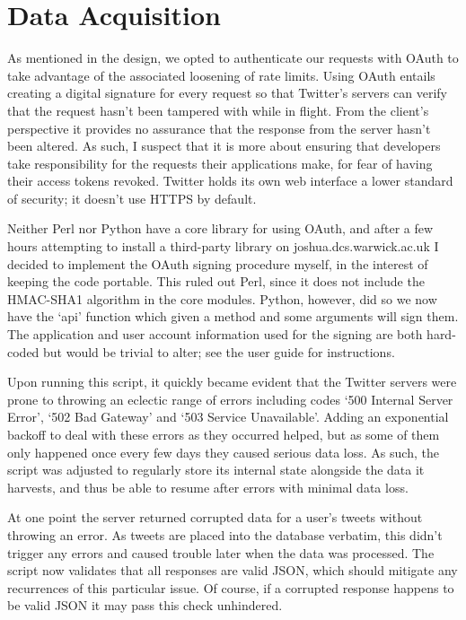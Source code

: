\section{Data Acquisition}

As mentioned in the design, we opted to authenticate our requests with OAuth to take advantage of the associated loosening of rate limits. Using OAuth entails creating a digital signature for every request so that Twitter's servers can verify that the request hasn't been tampered with while in flight. From the client's perspective it provides no assurance that the response from the server hasn't been altered. As such, I suspect that it is more about ensuring that developers take responsibility for the requests their applications make, for fear of having their access tokens revoked. Twitter holds its own web interface a lower standard of security; it doesn't use HTTPS by default.

Neither Perl nor Python have a core library for using OAuth, and after a few hours attempting to install a third-party library on joshua.dcs.warwick.ac.uk I decided to implement the OAuth signing procedure myself, in the interest of keeping the code portable. This ruled out Perl, since it does not include the HMAC-SHA1 algorithm in the core modules. Python, however, did so we now have the `api' function which given a method and some arguments will sign them. The application and user account information used for the signing are both hard-coded but would be trivial to alter; see the user guide for instructions.

Upon running this script, it quickly became evident that the Twitter servers were prone to throwing an eclectic range of errors including codes `500 Internal Server Error', `502 Bad Gateway' and ‘503 Service Unavailable'. Adding an exponential backoff to deal with these errors as they occurred helped, but as some of them only happened once every few days they caused serious data loss. As such, the script was adjusted to regularly store its internal state alongside the data it harvests, and thus be able to resume after errors with minimal data loss.

At one point the server returned corrupted data for a user's tweets without throwing an error. As tweets are placed into the database verbatim, this didn't trigger any errors and caused trouble later when the data was processed. The script now validates that all responses are valid JSON, which should mitigate any recurrences of this particular issue. Of course, if a corrupted response happens to be valid JSON it may pass this check unhindered.

